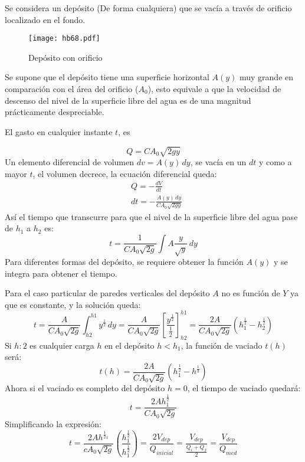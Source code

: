 Se considera un depósito (De forma cualquiera) que se vacía a través de orificio localizado en el fondo.

\begin{figure}[h!]
\centering
  \texttt{[image: hb68.pdf]}
  \caption{Depósito con orificio}
  \label{hb68}
\end{figure}

Se supone que el depósito tiene una superficie horizontal $A(y)$ muy grande en comparación con el área del orificio ($A_0$), esto equivale a que la velocidad de descenso del nivel de la superficie libre del agua es de una magnitud prácticamente despreciable.

El gasto en cualquier instante $t$, es

\begin{equation}
    Q = CA_0 \sqrt{2gy}
\end{equation}
Un elemento diferencial de volumen $dv=A(y)\,dy$, se vacía en un $dt$ y como a mayor $t$, el volumen decrece, la ecuación diferencial queda:
\begin{align*}
    &Q =- \frac{dV}{dt}\\
    &dt =- \frac{A(y)\,dy}{CA_0 \sqrt{2gy}}
\end{align*}
Así el tiempo que transcurre para que el nivel de la superficie libre del agua pase de $h_1$ a $h_2$ es:
\begin{equation}
    t = \frac{1}{CA_0 \sqrt{2g}}\int A\frac{y}{\sqrt{y}}\,dy 
\end{equation}
Para diferentes formas del depósito, se requiere obtener la función $A(y)$ y se integra para obtener el tiempo.

Para el caso particular de paredes verticales del depósito $A$ no es función de $Y$ ya que es constante, y la solución queda:
\begin{equation}
    t = \frac{A}{CA_0 \sqrt{2g}}\int_{h2}^{h1}y^{\frac{1}{2}}\,dy = \frac{A}{CA_0 \sqrt{2g}}\left[\frac{y^{\frac{1}{2}}}{\frac{1}{2}}\right]_{h2}^{h1} = \frac{2A}{CA_0 \sqrt{2g}}\left(h_1^{\frac{1}{2}} - h_2^{\frac{1}{2}}\right)
\end{equation}
Si $h:2$ es cualquier carga $h$ en el depósito $h<h_1$, la función de vaciado $t(h)$ será:
\begin{equation*}
    t(h) = \frac{2A}{CA_0 \sqrt{2g}}\left(h_1^{\frac{1}{2}} - h^{\frac{1}{2}}\right)
\end{equation*}
Ahora si el vaciado es completo del depósito $h=0$, el tiempo de vaciado quedará:
\begin{equation*}
    t = \frac{2Ah^{\frac{1}{2}}_1}{CA_0 \sqrt{2g}}
\end{equation*}
Simplificando la expresión:
\begin{equation*}
    t = \frac{2Ah^{\frac{1}{2}_1}}{{cA_0 \sqrt{2g}}}\left(\frac{h^{\frac{1}{2}}_1}{h_1^{\frac{1}{2}}}\right) = \frac{2V_{dep}}{Q_{inicial}} = \frac{V_{dep}}{\frac{Q_i + Q_f}{2}} = \frac{V_{dep}}{Q_{med}}
\end{equation*}

